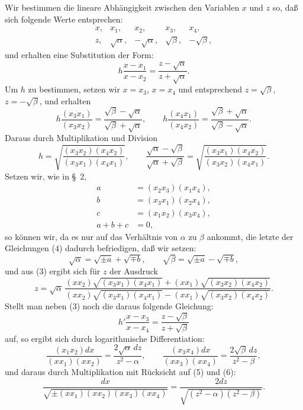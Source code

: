 \documentclass[11pt]{article}
\begin{document}
Wir bestimmen die lineare Abhängigkeit zwischen den Variablen $x$ und $z$ so, daß sich folgende Werte entsprechen:
\begin{equation}
\begin{array}{ccccc}
x,&x_1,&x_2,&x_3,&x_4,\\
z,&\sqrt{\alpha},&-\sqrt{\alpha},&\sqrt{\beta},&-\sqrt{\beta},
\end{array}
\tag{2}
\end{equation}
und erhalten eine Substitution der Form:
\begin{equation}
h\frac{x-x_1}{x-x_2}=\frac{z-\sqrt{\alpha}}{z+\sqrt{\alpha}}.
\tag{3}
\end{equation}
Um $h$ zu bestimmen, setzen wir $x=x_3$, $x=x_4$ und entsprechend $z=\sqrt{\beta}$, $z=-\sqrt{\beta}$, und erhalten
\[
h\frac{(x_3x_1)}{(x_3x_2)}=\frac{\sqrt{\beta}-\sqrt{\alpha}}{\sqrt{\beta}+\sqrt{\alpha}},\qquad
h\frac{(x_4x_1)}{(x_4x_2)}=\frac{\sqrt{\beta}+\sqrt{\alpha}}{\sqrt{\beta}-\sqrt{\alpha}}.
\]
Daraus durch Multiplikation und Division
\begin{equation}
h=\sqrt{\frac{(x_3x_2)(x_4x_2)}{(x_3x_1)(x_4x_1)}},\qquad
\frac{\sqrt{\alpha}-\sqrt{\beta}}{\sqrt{\alpha}+\sqrt{\beta}}=
\sqrt{\frac{(x_3x_1)(x_4x_2)}{(x_3x_2)(x_4x_1)}}.
\tag{4}
\end{equation}
Setzen wir, wie in \S~2,
\begin{equation}
\begin{aligned}
a&=(x_2x_3)(x_1x_4),\\
b&=(x_3x_1)(x_2x_4),\\
c&=(x_1x_2)(x_3x_4),\\
a+b+c&=0,
\end{aligned}
\tag{5}
\end{equation}
so können wir, da es nur auf das Verhältnis von $\alpha$ zu $\beta$ ankommt, die letzte der Gleichungen (4) dadurch befriedigen, daß wir setzen:
\begin{equation}
\sqrt{\alpha}=\sqrt{\pm a}+\sqrt{\mp b},\qquad
\sqrt{\beta}=\sqrt{\pm a}-\sqrt{\mp b},
\tag{6}
\end{equation}
und aus (3) ergibt sich für $z$ der Ausdruck
\begin{equation}
z=\sqrt{\alpha}\,
\frac{(xx_2)\sqrt{(x_3x_1)(x_4x_1)}+(xx_1)\sqrt{(x_3x_2)(x_4x_2)}}
{(xx_2)\sqrt{(x_3x_1)(x_4x_1)}-(xx_1)\sqrt{(x_3x_2)(x_4x_2)}}.
\tag{7}
\end{equation}
Stellt man neben (3) noch die daraus folgende Gleichung:
\[
h'\frac{x-x_3}{x-x_4}=\frac{z-\sqrt{\beta}}{z+\sqrt{\beta}}
\]
auf, so ergibt sich durch logarithmische Differentiation:
\[
\frac{(x_1x_2)dx}{(xx_1)(xx_2)}=\frac{2\sqrt{\alpha}\,dz}{z^2-\alpha},\qquad
\frac{(x_3x_4)dx}{(xx_3)(xx_4)}=\frac{2\sqrt{\beta}\,dz}{z^2-\beta},
\]
und daraus durch Multiplikation mit Rücksicht auf (5) und (6):
\begin{equation}
\frac{dx}{\sqrt{\pm (xx_1)(xx_2)(xx_3)(xx_4)}}=
\frac{2dz}{\sqrt{(z^2-\alpha)(z^2-\beta)}}.
\tag{8}
\end{equation}
\end{document}
